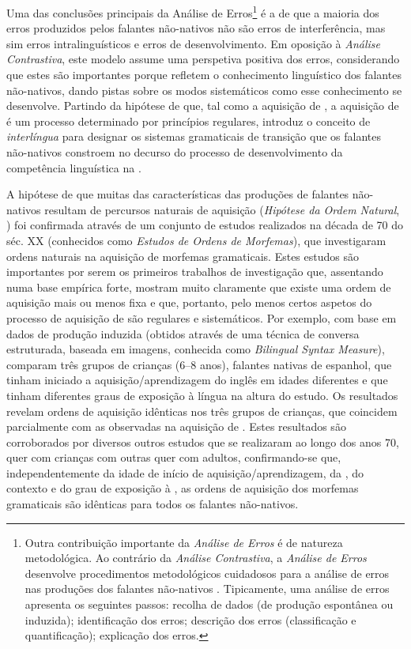 \documentclass[output=paper]{LSP/langsci}
\begin{document}
Uma das conclusões principais da Análise de Erros\footnote{Outra contribuição importante da \textit{Análise de Erros} é de natureza metodológica. Ao contrário da \textit{Análise Contrastiva}, a \textit{Análise de Erros} desenvolve procedimentos metodológicos cuidadosos para a análise de erros nas produções dos falantes não-nativos \citep{corder1974}. Tipicamente, uma análise de erros apresenta os seguintes passos: recolha de dados (de produção espontânea ou induzida); identificação dos erros; descrição dos erros (classificação e quantificação); explicação dos erros.} é a de que a maioria dos erros produzidos pelos falantes não-nativos não são erros de interferência, mas sim erros intralinguísticos e erros de desenvolvimento. Em oposição à \textit{Análise Contrastiva}, este modelo assume uma perspetiva positiva dos erros, considerando que estes são importantes porque refletem o conhecimento linguístico dos falantes não-nativos, dando pistas sobre os modos sistemáticos como esse conhecimento se desenvolve. Partindo da hipótese de que, tal como a aquisição de , a aquisição de  é um processo determinado por princípios regulares, \citet{selinker1972} introduz o conceito de \textit{interlíngua} para designar os sistemas gramaticais de transição que os falantes não-nativos constroem no decurso do processo de desenvolvimento da competência linguística na .

A hipótese de que muitas das características das produções de falantes não-nativos resultam de percursos naturais de aquisição (\textit{Hipótese da Ordem Natural}, \citealt{krashen1981}) foi confirmada através de um conjunto de estudos realizados na década de 70 do séc. XX (conhecidos como \textit{Estudos de Ordens de Morfemas}), que investigaram ordens naturais na aquisição de morfemas gramaticais. Estes estudos são importantes por serem os primeiros trabalhos de investigação que, assentando numa base empírica forte, mostram muito claramente que existe uma ordem de aquisição mais ou menos fixa e que, portanto, pelo menos certos aspetos do processo de aquisição de  são regulares e sistemáticos. Por exemplo, com base em dados de produção induzida (obtidos através de uma técnica de conversa estruturada, baseada em imagens, conhecida como \textit{Bilingual Syntax Measure}), \citet{dulayburt1973} comparam três grupos de crianças (6--8 anos), falantes nativas de espanhol, que tinham iniciado a aquisição/aprendizagem do inglês em idades diferentes e que tinham diferentes graus de exposição à língua na altura do estudo. Os resultados revelam ordens de aquisição idênticas nos três grupos de crianças, que coincidem parcialmente com as observadas na aquisição de . Estes resultados são corroborados por diversos outros estudos que se realizaram ao longo dos anos 70, quer com crianças com outras  quer com adultos, confirmando-se que, independentemente da idade de início de aquisição/aprendizagem, da , do contexto e do grau de exposição à , as ordens de aquisição dos morfemas gramaticais são idênticas para todos os falantes não-nativos. 
\end{document}
